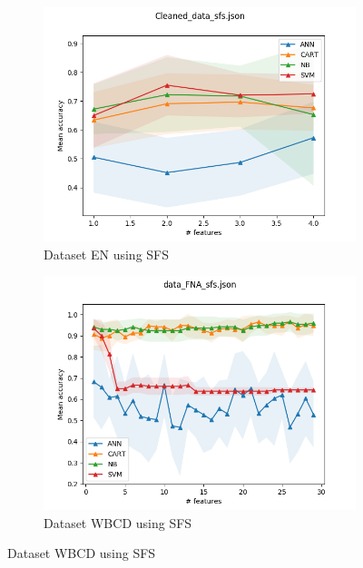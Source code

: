 \begin{figure}[htbp!]
  \centering
  \begin{subfigure}[b]{0.475\textwidth}
      \centering
      \includegraphics[width=\textwidth]{../plots_with_std_fill/Cleaned_data_sf_combined.png}
      \caption[]%
      {{\small Dataset EN using SFS}}
      \label{fig:EN_sfs}
  \end{subfigure}
  \hfill
  \begin{subfigure}[b]{0.475\textwidth}
      \centering
      \includegraphics[width=\textwidth]{../plots_with_std_fill/data_FNA_sf_combined.png}
      \caption[]%
      {{\small Dataset WBCD using SFS}}
      \label{fig:WBCD_sfs}
  \end{subfigure}

\end{figure}
